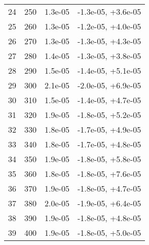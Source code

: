 \begin{table}
\begin{adjustbox}{width=1\textwidth/2}
\begin{tabular}{|c|c|c|c|}
\cline{1-4}
24 & 250 & 1.3e-05 & -1.3e-05, +3.6e-05 \\
\cline{1-4}
25 & 260 & 1.3e-05 & -1.2e-05, +4.0e-05 \\
\cline{1-4}
26 & 270 & 1.3e-05 & -1.3e-05, +4.3e-05 \\
\cline{1-4}
27 & 280 & 1.4e-05 & -1.3e-05, +3.8e-05 \\
\cline{1-4}
28 & 290 & 1.5e-05 & -1.4e-05, +5.1e-05 \\
\cline{1-4}
29 & 300 & 2.1e-05 & -2.0e-05, +6.9e-05 \\
\cline{1-4}
30 & 310 & 1.5e-05 & -1.4e-05, +4.7e-05 \\
\cline{1-4}
31 & 320 & 1.9e-05 & -1.8e-05, +5.2e-05 \\
\cline{1-4}
32 & 330 & 1.8e-05 & -1.7e-05, +4.9e-05 \\
\cline{1-4}
33 & 340 & 1.8e-05 & -1.7e-05, +4.8e-05 \\
\cline{1-4}
34 & 350 & 1.9e-05 & -1.8e-05, +5.8e-05 \\
\cline{1-4}
35 & 360 & 1.8e-05 & -1.8e-05, +7.6e-05 \\
\cline{1-4}
36 & 370 & 1.9e-05 & -1.8e-05, +4.7e-05 \\
\cline{1-4}
37 & 380 & 2.0e-05 & -1.9e-05, +6.4e-05 \\
\cline{1-4}
38 & 390 & 1.9e-05 & -1.8e-05, +4.8e-05 \\
\cline{1-4}
39 & 400 & 1.9e-05 & -1.8e-05, +5.0e-05 \\
\cline{1-4}
\end{tabular}
\end{adjustbox}
\end{table}

